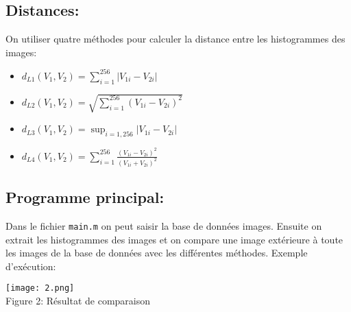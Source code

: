 \documentclass[12pt,a4paper,notitlepage]{report}
\begin{document}
\subsection*{Distances:}
On utiliser quatre méthodes pour calculer la distance entre les histogrammes des images:
\begin{itemize}
	\item $d_{L1}(V_1,V_2)=\displaystyle\sum_{i=1}^{256} |V_{1i}-V_{2i}|$
	\item $d_{L2}(V_1,V_2)=\displaystyle \sqrt{\sum_{i=1}^{256} (V_{1i}-V_{2i})^2}$
	\item $d_{L3}(V_1,V_2)=\displaystyle\sup_{i=1,256} |V_{1i}-V_{2i}|$
	\item $d_{L4}(V_1,V_2)=\displaystyle\sum_{i=1}^{256} \frac{(V_{1i}-V_{2i})^2}{(V_{1i}+V_{2i})^2}$

\end{itemize}
\subsection*{Programme principal:}
Dans le fichier \texttt{main.m} on peut saisir la base de données images. Ensuite on extrait les histogrammes des images et on compare une image extérieure à toute les images de la base de données avec les différentes méthodes.
Exemple d'exécution:
\begin{center}
\texttt{[image: 2.png]}\\
Figure 2: Résultat de comparaison
\end{center}
\end{document}
